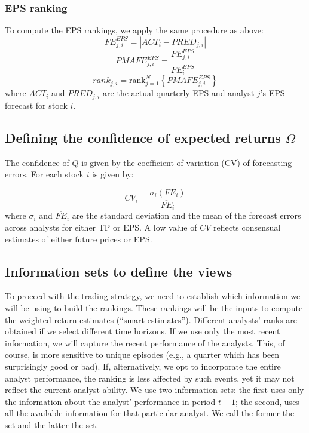 \documentclass[a4paper,twoside,12pt,openright,notitlepage]{report}\usepackage[]{graphicx}\usepackage[]{color}
\begin{document}
\subsubsection{EPS ranking}
\label{ch1:sec-eps}
To compute the EPS rankings, we apply the same procedure as above:
\begin{equation}
FE_{j,i}^{EPS}=|{ACT_{i}-PRED_{j,i}}|
\end{equation}
\begin{equation}
PMAFE_{j,i}^{EPS}= \frac{FE_{j,i}^{EPS}}{\overline{FE_{i}^{EPS}}}
\end{equation}
\begin{equation}
\label{ch1-eps:rank}
rank_{j,i}=\mathrm{rank}_{j=1}^{N} \left\{ PMAFE_{j,i}^{EPS} \right\}
\end{equation}
where $ACT_{i}$ and $PRED_{j,i}$ are the actual quarterly EPS and  analyst $j$'s EPS forecast for stock $i$.


\subsection{Defining the confidence of expected returns $\Omega$}
\label{def-omega}
The confidence of $Q$ is given by the coefficient of variation (CV) of forecasting errors. For each stock $i$ is given by:

\begin{equation}
\label{eq-cv}
CV_{i} = \frac{\sigma_i (FE_{i})}{\overline{FE}_{i}}
\end{equation}
where $\sigma_i$ and $\overline{FE}_i$ are the standard deviation and the mean of the forecast errors across analysts for either TP or EPS. A low value of $CV$ reflects consensual estimates of either future prices or EPS.



\subsection{Information sets to define the views}
\label{inf-set}
To proceed with the trading strategy, we need to establish which information we  will be using to build the rankings. These rankings will be the inputs to compute the weighted return estimates (``smart estimates''). Different analysts' ranks are obtained  if we select different time horizons. If we use only the most  recent information, we will capture the recent performance of the analysts. This, of course, is more sensitive to unique episodes (e.g., a quarter which has been surprisingly good or bad). If, alternatively, we opt to incorporate the entire analyst performance, the ranking is less affected by such events, yet it may not reflect the current analyst ability. We use two information sets: the first uses only the  information about the analyst' performance in period $t-1$; the second, uses all the available  information for that particular analyst. We call the former the \naive{} set and the latter the  set.
\end{document}
